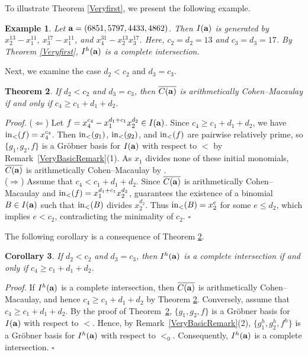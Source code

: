 \documentclass[10pt]{amsart}
\newtheorem{thm1}{Theorem}[section]
\newtheorem{cor1}[thm1]{Corollary}
\newtheorem{ex1}[thm1]{Example}
\begin{document}
To illustrate Theorem \ref{Veryfirst}, we present the following example.

\begin{ex1} {\rm Let ${\bf a}=(6851, 5797, 4433, 4862)$. Then $I({\bf a})$ is generated by $x_{2}^{13}-x_1^{11}$, $x_{3}^{17}-x_{1}^{11}$, and $x_{4}^{31}-x_{2}^{13}x_{3}^{17}$. Here, $c_2=d_2=13$ and $c_3=d_3=17$. By Theorem \ref{Veryfirst}, $I^{h}({\bf a})$ is a complete intersection.}
\end{ex1}

Next, we examine the case $d_2<c_2$ and $d_3=c_3$.

\begin{thm1} \label{ACM5} If $d_2<c_{2}$ and $d_{3}=c_3$, then $\overline{C({\bf a})}$ is arithmetically Cohen--Macaulay if and only if $c_{4} \geq c_1+d_{1}+d_{2}$.
\end{thm1}

{\em \noindent Proof.} ($\Leftarrow$) Let $f=x_{4}^{c_4}-x_{1}^{d_1+c_1}x_{2}^{d_2} \in I({\bf a})$. Since $c_{4} \geq c_1+d_{1}+d_{2}$, we have ${\rm in}_{<}(f)=x_{4}^{c_4}$. Then ${\rm in}_{<}(g_1)$, ${\rm in}_{<}(g_2)$, and ${\rm in}_{<}(f)$ are pairwise relatively prime, so $\{g_1, g_2, f\}$ is a Gr\"obner basis for $I({\bf a})$ with respect to $<$ by Remark~\ref{VeryBasicRemark}(1). As $x_1$ divides none of these initial monomials, $\overline{C({\bf a})}$ is arithmetically Cohen--Macaulay by \cite[Theorem 2.2]{HerSta}.\\
($\Rightarrow$) Assume that $c_{4}<c_1+d_{1}+d_{2}$. Since $\overline{C({\bf a})}$ is arithmetically Cohen--Macaulay and ${\rm in}_{<}(f)=x_{1}^{d_1+c_1}x_{2}^{d_2}$, \cite[Theorem~2.2]{HerSta} guarantees the existence of a binomial $B \in I({\bf a})$ such that ${\rm in}_{<}(B)$ divides $x_{2}^{d_2}$. Thus ${\rm in}_{<}(B)=x_{2}^{e}$ for some $e \leq d_2$, which implies $e<c_2$, contradicting the minimality of $c_2$. \hfill $\square$ \par\vspace{0.5\baselineskip}

The following corollary is a consequence of Theorem \ref{ACM5}.

\begin{cor1} \label{Cor12} If $d_2<c_{2}$ and $d_{3}=c_3$, then $I^{h}({\bf a})$ is a complete intersection if and only if $c_{4} \geq c_1+d_{1}+d_{2}$.
\end{cor1}

{\em \noindent Proof.} If $I^{h}({\bf a})$ is a complete intersection, then $\overline{C({\bf a})}$ is arithmetically Cohen--Macaulay, and hence $c_{4} \geq c_1+d_{1}+d_{2}$ by Theorem \ref{ACM5}. Conversely, assume that $c_{4} \geq c_1+d_{1}+d_{2}$. By the proof of Theorem~\ref{ACM5}, $\{g_1,g_2,f\}$ is a Gr\"obner basis for $I({\bf a})$ with respect to $<$. Hence, by Remark~\ref{VeryBasicRemark}(2), $\{g_1^{h},g_2^{h},f^{h}\}$ is a Gr\"obner basis for $I^{h}({\bf a})$ with respect to $<_0$. Consequently, $I^{h}({\bf a})$ is a complete intersection. \hfill $\square$ \par\vspace{0.5\baselineskip}
\end{document}

